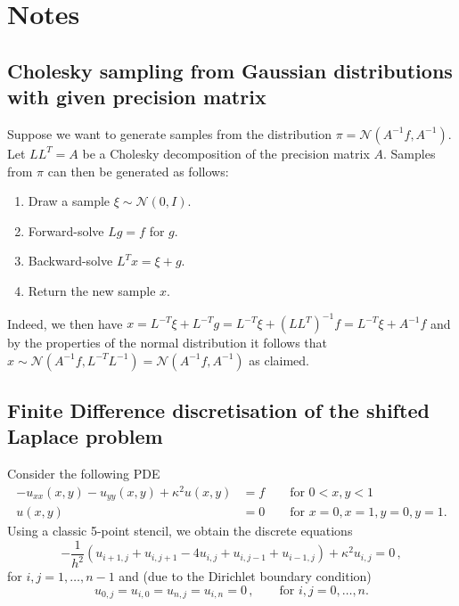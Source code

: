 \documentclass[
fontsize=11pt,
paper=a4,
numbers=noenddot
]{scrartcl}
\begin{document}
\section{Notes}
\subsection{Cholesky sampling from Gaussian distributions with given precision matrix}
Suppose we want to generate samples from the distribution $\pi = \mathcal{N}(A^{-1} f, A^{-1})$. Let $LL^T = A$ be a Cholesky decomposition of the precision matrix $A$. Samples from $\pi$ can then be generated as follows:
\begin{enumerate}
    \item Draw a sample $\xi \sim \mathcal{N}(0,I)$.
    \item Forward-solve $L g = f$ for $g$.
    \item Backward-solve $L^T x = \xi + g$.
    \item Return the new sample $x$.
\end{enumerate}
Indeed, we then have $x = L^{-T} \xi + L^{-T} g = L^{-T} \xi + {(LL^T)}^{-1} f =  L^{-T} \xi + A^{-1} f$ and by the properties of the normal distribution it follows that $x \sim \mathcal{N}(A^{-1} f, L^{-T}L^{-1}) = \mathcal{N}(A^{-1} f, A^{-1})$ as claimed.

\subsection{Finite Difference discretisation of the shifted Laplace problem}
Consider the following PDE
\begin{align*}
    -u_{xx}(x,y) - u_{yy}(x,y) + \kappa^2 u(x,y) &= f \qquad \text{for $0 < x,y < 1$} \\
    u(x,y) &= 0 \qquad \text{for $x = 0, x = 1, y = 0, y = 1$.}
\end{align*}
Using a classic 5-point stencil, we obtain the discrete equations
\begin{equation*}
    -\frac{1}{h^2}\left(
        u_{i+1,j} + u_{i,j+1} - 4u_{i,j} + u_{i,j-1} + u_{i-1,j}
    \right)
    + \kappa^2 u_{i,j} = 0\,,
\end{equation*}
for $i,j = 1,\dotsc,n-1$ and (due to the Dirichlet boundary condition)
\begin{equation*}
    u_{0,j} = u_{i,0} = u_{n,j} = u_{i,n} = 0\,, \qquad\text{for $i,j = 0,\dotsc,n$.} 
\end{equation*}
\end{document}
